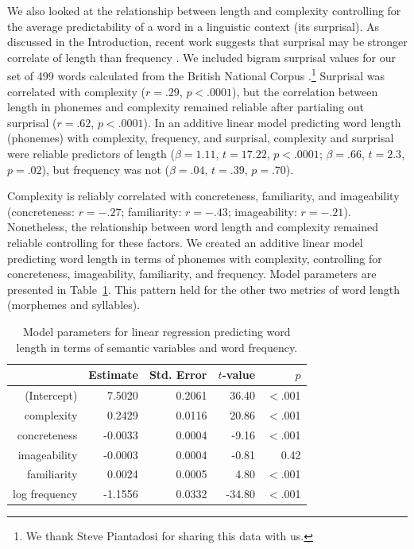 We also looked at the relationship between length and complexity controlling for the average predictability of a word in a linguistic context (its surprisal). As discussed in the Introduction, recent work suggests that surprisal may be stronger correlate of length than frequency \cite{piantadosi2011a}. We included bigram surprisal values for our set of 499 words calculated from the British National Corpus \cite{clear1993british}.\footnote{We thank Steve Piantadosi for sharing this data with us.} Surprisal was correlated with complexity ($r = .29$, $p < .0001$), but the correlation between length in phonemes and complexity remained reliable after partialing out surprisal ($r = .62$, $p < .0001$). In an additive linear model predicting word length (phonemes) with complexity, frequency, and surprisal, complexity and surprisal were reliable predictors of length ($\beta = 1.11$, $t = 17.22$, $p < .0001$; $\beta = .66$, $t = 2.3$, $p = .02$), but frequency was not ($\beta = .04$, $t = .39$, $p =. 70$).

Complexity is reliably correlated with concreteness, familiarity, and imageability (concreteness: $r = -.27$; familiarity: $r = -.43$; imageability: $r = -.21$). Nonetheless, the relationship between word length and complexity remained reliable controlling for these factors. We created an additive linear model predicting word length in terms of phonemes with complexity, controlling for concreteness, imageability, familiarity, and frequency. Model parameters are presented in Table~\ref{exp9model}. This pattern held for the other two metrics of word length (morphemes and syllables).

\begin{table}[t]
\centering
\begin{tabular}{rrrrr}
 \hline
 & Estimate & Std. Error & $t$-value & $p$ \\
 \hline
(Intercept) & 7.5020 & 0.2061 & 36.40 & $<$.001 \\
 complexity & 0.2429 & 0.0116 & 20.86 & $<$.001\\
  concreteness & -0.0033 & 0.0004 & -9.16 & $<$.001 \\
 imageability & -0.0003 & 0.0004 & -0.81 & 0.42 \\
  familiarity & 0.0024 & 0.0005 & 4.80 & $<$.001 \\
 log frequency & -1.1556 & 0.0332 & -34.80 & $<$.001 \\
  \hline
\end{tabular}
\caption{Model parameters for linear regression predicting word length in terms of semantic variables and word frequency.}
\label{exp9model}
\end{table}


